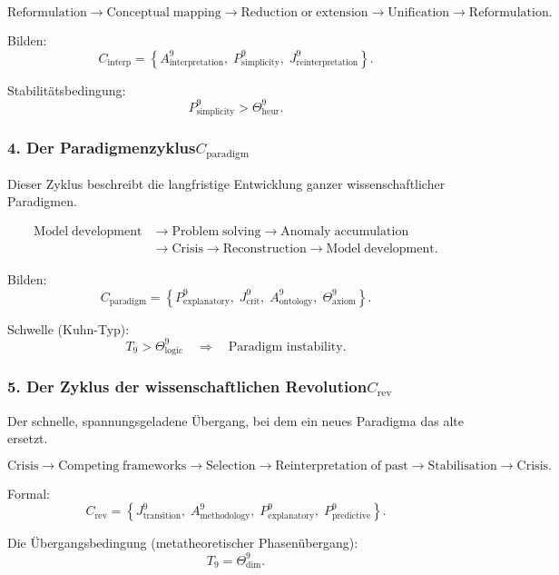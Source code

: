 \[
  \mathrm{Reformulation}
  \to
  \mathrm{Conceptual\;mapping}
  \to
  \mathrm{Reduction\;or\;extension}
  \to
  \mathrm{Unification}
  \to
  \mathrm{Reformulation}.
\]

Bilden:
\[
 C_{\mathrm{interp}}
  =
  \left\{
    A^9_{\mathrm{interpretation}},\;
    P^9_{\mathrm{simplicity}},\;
    J^9_{\mathrm{reinterpretation}}
  \right\}.
\]

Stabilitätsbedingung:
\[
  P^9_{\mathrm{simplicity}} >
  \Theta^9_{\mathrm{heur}}.
\]


\subsubsection{4. Der Paradigmenzyklus$C_{\mathrm{paradigm}}$}

Dieser Zyklus beschreibt die langfristige Entwicklung ganzer wissenschaftlicher Paradigmen.

\[
  \begin{aligned}
  \mathrm{Model\;development}
  &\to \mathrm{Problem\;solving}
  \to \mathrm{Anomaly\;accumulation}\\
  &\to \mathrm{Crisis}
  \to \mathrm{Reconstruction}
  \to \mathrm{Model\;development}.
  \end{aligned}
\]

Bilden:
\[
 C_{\mathrm{paradigm}}
  =
  \left\{
    P^9_{\mathrm{explanatory}},\;
    J^9_{\mathrm{crit}},\;
    A^9_{\mathrm{ontology}},\;
    \Theta^9_{\mathrm{axiom}}
  \right\}.
\]

Schwelle (Kuhn-Typ):
\[
  T_9 > \Theta^9_\mathrm{logic}
  \quad\Rightarrow\quad
  \text{Paradigm instability}.
\]


\subsubsection{5. Der Zyklus der wissenschaftlichen Revolution$C_{\mathrm{rev}}$}

Der schnelle, spannungsgeladene Übergang, bei dem ein neues Paradigma das alte ersetzt.

\[
  \mathrm{Crisis}
  \to
  \mathrm{Competing\;frameworks}
  \to
  \mathrm{Selection}
  \to
  \mathrm{Reinterpretation\;of\;past}
  \to
  \mathrm{Stabilisation}
  \to
  \mathrm{Crisis}.
\]

Formal:
\[
 C_{\mathrm{rev}}
   =
   \left\{
     J^9_{\mathrm{transition}},\;
     A^9_{\mathrm{methodology}},\;
     P^9_{\mathrm{explanatory}},\;
     P^9_{\mathrm{predictive}}
   \right\}.
\]

Die Übergangsbedingung (metatheoretischer Phasenübergang):
\[
  T_9 = \Theta^9_{\mathrm{dim}}.
\]

